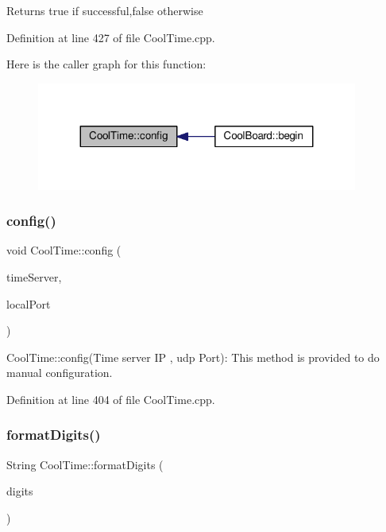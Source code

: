 \begin{DoxyReturn}{Returns}
true if successful,false otherwise 
\end{DoxyReturn}


Definition at line 427 of file Cool\+Time.\+cpp.

Here is the caller graph for this function\+:\nopagebreak
\begin{figure}[H]
\begin{center}
\leavevmode
\includegraphics[width=299pt]{class_cool_time_a87c28260c1bc77091162cbcf1ee2e129_icgraph}
\end{center}
\end{figure}
\mbox{\label{class_cool_time_a014656d0d3f74d6391364b92b13e0780}} 
\subsubsection{\texorpdfstring{config()}{config()}\hspace{0.1cm}{\footnotesize\ttfamily [2/2]}}
{\footnotesize\ttfamily void Cool\+Time\+::config (\begin{DoxyParamCaption}\item[{I\+P\+Address}]{time\+Server,  }\item[{unsigned int}]{local\+Port }\end{DoxyParamCaption})}

Cool\+Time\+::config(\+Time server I\+P , udp Port)\+: This method is provided to do manual configuration. 

Definition at line 404 of file Cool\+Time.\+cpp.

\mbox{\label{class_cool_time_acd537cd4210d7bde4e1f5c47d2ac0456}} 
\subsubsection{\texorpdfstring{format\+Digits()}{formatDigits()}}
{\footnotesize\ttfamily String Cool\+Time\+::format\+Digits (\begin{DoxyParamCaption}\item[{int}]{digits }\end{DoxyParamCaption})}

